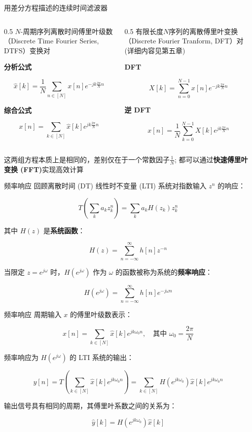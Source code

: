 \documentclass[
  ignorenonframetext,
]{beamer}
\begin{document}
\begin{frame}{用差分方程描述的连续时间滤波器}
\protect{}\label{sec384}
\begin{columns}[T]
\begin{column}{0.5\linewidth}
\(N\)-周期序列离散时间傅里叶级数（Discrete Time Fourier Series,
DTFS）变换对

\textbf{分析公式}

\[
\hat{x}[k]=\frac{1}{N} \sum_{n \in[N]} x[n] e^{-j k \frac{2 \pi}{N} n}
\]

\textbf{综合公式}

\[
x[n]=\sum_{k \in[N]} \hat{x}[k] e^{j k \frac{2 \pi}{N} n}
\]
\end{column}

\begin{column}{0.5\linewidth}
有限长度\(N\)序列的离散傅里叶变换（Discrete Fourier Tranform,
DFT）对(详细内容见第五章)

\textbf{DFT}

\[
X[k]=\sum_{n=0}^{N-1} x[n] e^{-j k \frac{2 \pi}{N} n}
\]

\textbf{逆 DFT}

\[
x[n]=\frac{1}{N} \sum_{k=0}^{N-1} X[k] e^{j k \frac{2 \pi}{N} n}
\]
\end{column}
\end{columns}

这两组方程本质上是相同的，差别仅在于一个常数因子\(\frac{1}{N}\);
都可以通过\textbf{快速傅里叶变换 (FFT)}实现高效计算
\end{frame}

\begin{frame}{频率响应}
\protect{}\label{ux9891ux7387ux54cdux5e94-1}
回顾离散时间 (DT) 线性时不变量 (LTI) 系统对指数输入 \(z^n\) 的响应：

\[T\left( \sum_{k} a_k z_k^n \right) = \sum_{k} a_k H(z_k) z_k^n\]

其中 \(H(z)\) 是\textbf{系统函数}：

\[H(z) = \sum_{n=-\infty}^{\infty} h[n] z^{-n}\]

当限定 \(z = e^{j\omega}\) 时，\(H(e^{j\omega})\) 作为 \(\omega\)
的函数被称为系统的\textbf{频率响应}：

\[H(e^{j\omega}) = \sum_{n=-\infty}^{\infty} h[n] e^{-j\omega n}\]
\end{frame}

\begin{frame}{频率响应}
\protect{}\label{ux9891ux7387ux54cdux5e94-2}
周期输入 \(x\) 的傅里叶级数表示：

\[x[n] = \sum_{k \in [N]} \hat{x}[k] e^{j k \omega_0 n}, \quad \text{其中 } \omega_0 = \frac{2\pi}{N}\]

频率响应为 \(H(e^{j\omega})\) 的 LTI 系统的输出：

\[y[n] = T \left( \sum_{k \in [N]} \hat{x}[k] e^{j k \omega_0 n} \right) = \sum_{k \in [N]} H(e^{j k \omega_0}) \hat{x}[k] e^{j k \omega_0 n}\]

输出信号具有相同的周期，其傅里叶系数之间的关系为：

\[\hat{y}[k] = H(e^{j k \omega_0}) \hat{x}[k]\]
\end{frame}
\end{document}
